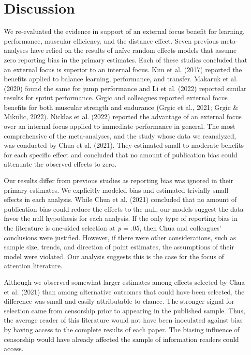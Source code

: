 \documentclass[
  man, donotrepeattitle,floatsintext]{apa7}
\begin{document}
\clearpage

\hypertarget{discussion}{%
\section{Discussion}\label{discussion}}

We re-evaluated the evidence in support of an external focus benefit for learning, performance, muscular efficiency, and the distance effect. Seven previous meta-analyses have relied on the results of naïve random effects models that assume zero reporting bias in the primary estimates. Each of these studies concluded that an external focus is superior to an internal focus. Kim et al. (2017) reported the benefits applied to balance learning, performance, and transfer. Makaruk et al. (2020) found the same for jump performance and Li et al. (2022) reported similar results for sprint performance. Grgic and colleagues reported external focus benefits for both muscular strength and endurance (Grgic et al., 2021; Grgic \& Mikulic, 2022). Nicklas et al. (2022) reported the advantage of an external focus over an internal focus applied to immediate performance in general. The most comprehensive of the meta-analyses, and the study whose data we reanalyzed, was conducted by Chua et al. (2021). They estimated small to moderate benefits for each specific effect and concluded that no amount of publication bias could attenuate the observed effects to zero.

Our results differ from previous studies as reporting bias was ignored in their primary estimates. We explicitly modeled bias and estimated trivially small effects in each analysis. While Chua et al. (2021) concluded that no amount of publication bias could reduce the effects to the null, our models suggest the data favor the null hypothesis for each analysis. If the only type of reporting bias in the literature is one-sided selection at \emph{p} = .05, then Chua and colleagues' conclusions were justified. However, if there were other considerations, such as sample size, trends, and direction of point estimates, the assumptions of their model were violated. Our analysis suggests this is the case for the focus of attention literature.

Although we observed somewhat larger estimates among effects selected by Chua et al. (2021) than among alternative outcomes that could have been selected, the difference was small and easily attributable to chance. The stronger signal for selection came from censorship prior to appearing in the published sample. Thus, the average reader of this literature would not have been inoculated against bias by having access to the complete results of each paper. The biasing influence of censorship would have already affected the sample of information readers could access.
\end{document}
